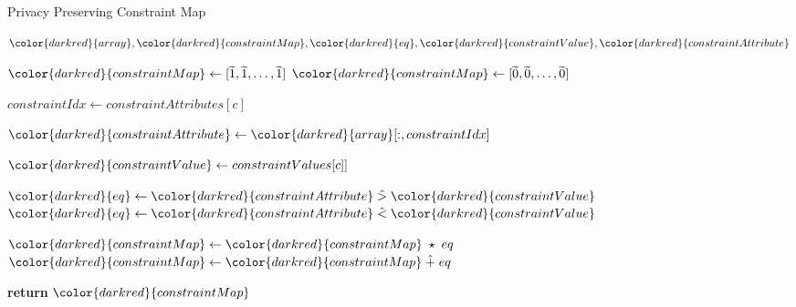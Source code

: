 \begin{algorithm}[H]
\caption{Privacy Preserving Constraint Map}\label{a:filters}
\begin{algorithmic}[1]
\renewcommand{\algorithmicrequire}{\textbf{Private Vars:}}
\Require ${\color{darkred}{array}}, {\color{darkred}{constraintMap}}, {\color{darkred}{eq}}, {\color{darkred}{constraintValue}}, {\color{darkred}{constraintAttribute}}$


        \State ${\color{darkred}{constraintMap}} \gets [\enc{1}, \enc{1}, \dots, \enc{1}]$
        \State ${\color{darkred}{constraintMap}} \gets [\enc{0}, \enc{0}, \dots, \enc{0}]$
    \EndIf


        \State $constraintIdx \gets constraintAttributes[c]$

        \State ${\color{darkred}{constraintAttribute}} \gets {\color{darkred}{array}}[:, constraintIdx]$

        \State ${\color{darkred}{constraintValue}} \gets constraintValues[c]]$ 

            \State ${\color{darkred}{eq}} \gets {\color{darkred}{constraintAttribute}} \hgt {\color{darkred}{constraintValue}}$
            \State ${\color{darkred}{eq}} \gets {\color{darkred}{constraintAttribute}} \hlt {\color{darkred}{constraintValue}}$
        \EndIf

            \State ${\color{darkred}{constraintMap}} \gets {\color{darkred}{constraintMap}} \hmul eq$
            \State ${\color{darkred}{constraintMap}} \gets {\color{darkred}{constraintMap}} \hplus eq$
        \EndIf

    \EndFor

    \State \textbf{return} {${\color{darkred}{constraintMap}}$}
\EndProcedure

\end{algorithmic}
\end{algorithm}

